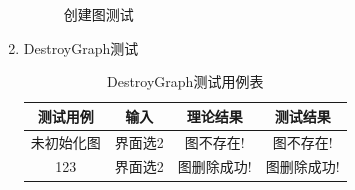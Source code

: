 \documentclass[supercite]{HustGraduPaper}
\theoremstyle{definition}
\begin{document}
\begin{enumerate}
\begin{figure}[htb]
		      \caption{创建图测试}
	      \end{figure}
	      \newpage
	\item DestroyGraph测试
	      \begin{table}[htb]
		      \begin{center}
			      \setlength{\tabcolsep}{2.0mm}
			      \caption{DestroyGraph测试用例表}
			      \label{t2}
			      \begin{tabular}{|c|c|c|c|}
				      \hline
				      测试用例   & 输入    & 理论结果    & 测试结果    \\
				      \hline
				      \hline
				      未初始化图 & 界面选2 & 图不存在!   & 图不存在!   \\
				      \hline
				      123        & 界面选2 & 图删除成功! & 图删除成功! \\
				      \hline
			      \end{tabular}
		      \end{center}
	      \end{table}
	      \begin{figure}[htb]
		      \centering
		      \quad
		      \\

\end{figure}
\end{enumerate}
\end{document}
